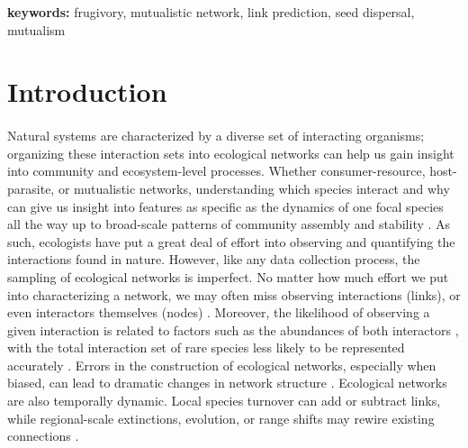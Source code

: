 \documentclass[num-refs]{article}%
\begin{document}
\textbf{keywords:} frugivory, mutualistic network, link prediction, seed dispersal, mutualism


\rsbreak
















\clearpage 

\section*{Introduction}
\paragraph*{}
Natural systems are characterized by a diverse set of interacting organisms; organizing these interaction sets into ecological networks can help us gain insight into community and ecosystem-level processes. Whether consumer-resource, host-parasite, or mutualistic networks, understanding which species interact and why can give us insight into features as specific as the dynamics of one focal species all the way up to broad-scale patterns of community assembly and stability \citep{guimaraes2020structure, saravia2022ecological}. As such, ecologists have put a great deal of effort into observing and quantifying the interactions found in nature. However, like any data collection process, the sampling of ecological networks is imperfect. No matter how much effort we put into characterizing a network, we may often miss observing interactions (links), or even interactors themselves (nodes) \citep{Young21}. Moreover, the likelihood of observing a given interaction is related to factors such as the abundances of both interactors \citep{canard2014empirical}, with the total interaction set of rare species less likely to be represented accurately \citep{olesen2011missing, cirtwill2019quantitative}. Errors in the construction of ecological networks, especially when biased, can lead to dramatic changes in network structure \citep{bluthgen2008, Young21}. Ecological networks are also temporally dynamic. Local species turnover can add or subtract links, while regional-scale extinctions, evolution, or range shifts may rewire existing connections \citep{olesen2011}. 
\end{document}
